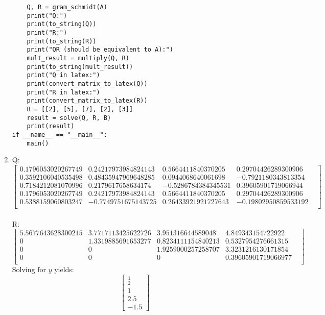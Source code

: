 \documentclass{article}
\begin{document}
\begin{enumerate}
\begin{lstlisting}
    Q, R = gram_schmidt(A)
    print("Q:")
    print(to_string(Q))
    print("R:")
    print(to_string(R))
    print("QR (should be equivalent to A):")
    mult_result = multiply(Q, R)
    print(to_string(mult_result))
    print("Q in latex:")
    print(convert_matrix_to_latex(Q))
    print("R in latex:")
    print(convert_matrix_to_latex(R))
    B = [[2], [5], [7], [2], [3]]
    result = solve(Q, R, B)
    print(result)
if __name__ == "__main__":
    main()
\end{lstlisting}
\item Q: \\
\[
\begin{bmatrix}
0.1796053020267749 & 0.24217973984824143 & 0.5664411840370205 & 0.29704426289300906 & \\
0.3592106040535498 & 0.48435947969648285 & 0.0944068640061698 & -0.7921180343813354 & \\
0.7184212081070996 & 0.2179617658634174 & -0.5286784384345531 & 0.39605901719066944 & \\
0.1796053020267749 & 0.24217973984824143 & 0.5664411840370205 & 0.29704426289300906 & \\
0.5388159060803247 & -0.7749751675143725 & 0.26433921921727643 & -0.19802950859533192 & \\
\end{bmatrix}
\]
\\
R:
\[
\begin{bmatrix}
5.5677643628300215 & 3.7717113425622726 & 3.951316644589048 & 4.849343154722922 & \\
0 & 1.3319885691653277 & 0.8234111154840213 & 0.5327954276661315 & \\
0 & 0 & 1.9259000257258707 & 3.3231216130171854 & \\
0 & 0 & 0 & 0.39605901719066977 & \\
\end{bmatrix}
\]
Solving for $y$ yields: \\
\[
\begin{bmatrix}
\frac{1}{2} \\
1 \\
2.5 \\
-1.5
\end{bmatrix}
\]
\end{enumerate}
\end{document}
